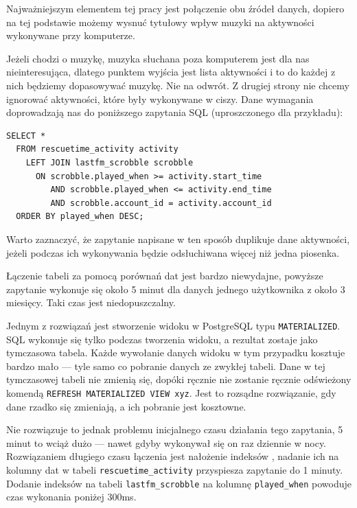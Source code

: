 \documentclass[openright]{xmgr}
\begin{document}
        Najważniejszym elementem tej pracy jest połączenie obu źródeł danych,
        dopiero na tej podstawie możemy wysnuć tytułowy wpływ muzyki na aktywności wykonywane przy komputerze.

        Jeżeli chodzi o muzykę, muzyka słuchana poza komputerem jest dla nas nieinteresująca,
        dlatego punktem wyjścia jest lista aktywności i to do każdej z nich będziemy dopasowywać muzykę. Nie na odwrót.
        Z drugiej strony nie chcemy ignorować aktywności, które były wykonywane w ciszy.
        Dane wymagania doprowadzają nas do poniższego zapytania SQL (uproszczonego dla przykładu):

\begin{verbatim}
SELECT *
  FROM rescuetime_activity activity
    LEFT JOIN lastfm_scrobble scrobble
      ON scrobble.played_when >= activity.start_time
         AND scrobble.played_when <= activity.end_time
         AND scrobble.account_id = activity.account_id
  ORDER BY played_when DESC;
\end{verbatim}

        Warto zaznaczyć, że zapytanie napisane w ten sposób duplikuje dane aktywności,
        jeżeli podczas ich wykonywania będzie odsłuchiwana więcej niż jedna piosenka.

        Łączenie tabeli za pomocą porównań dat jest bardzo niewydajne,
        powyższe zapytanie wykonuje się około 5 minut dla danych jednego użytkownika z około 3 miesięcy.
        Taki czas jest niedopuszczalny.

        Jednym z rozwiązań jest stworzenie widoku w PostgreSQL typu \verb|MATERIALIZED|.
        SQL wykonuje się tylko podczas tworzenia widoku, a rezultat zostaje jako tymczasowa tabela.
        Każde wywołanie danych widoku w tym przypadku kosztuje bardzo mało --- tyle samo co pobranie danych ze zwykłej tabeli.
        Dane w tej tymczasowej tabeli nie zmienią się, dopóki ręcznie nie zostanie ręcznie odświeżony komendą
        \verb|REFRESH MATERIALIZED VIEW xyz|. Jest to rozsądne rozwiązanie, gdy dane rzadko się zmieniają, a ich pobranie jest kosztowne.

        Nie rozwiązuje to jednak problemu inicjalnego czasu działania tego zapytania,
        5 minut to wciąż dużo --- nawet gdyby wykonywał się on raz dziennie w nocy.
        Rozwiązaniem długiego czasu łączenia jest nałożenie indeksów \cite{postgresql:efficient-indexes},
        nadanie ich na kolumny dat w tabeli \verb|rescuetime_activity| przyspiesza zapytanie do 1 minuty.
        Dodanie indeksów na tabeli \verb|lastfm_scrobble| na kolumnę \verb|played_when| powoduje czas wykonania poniżej 300ms.
\end{document}
